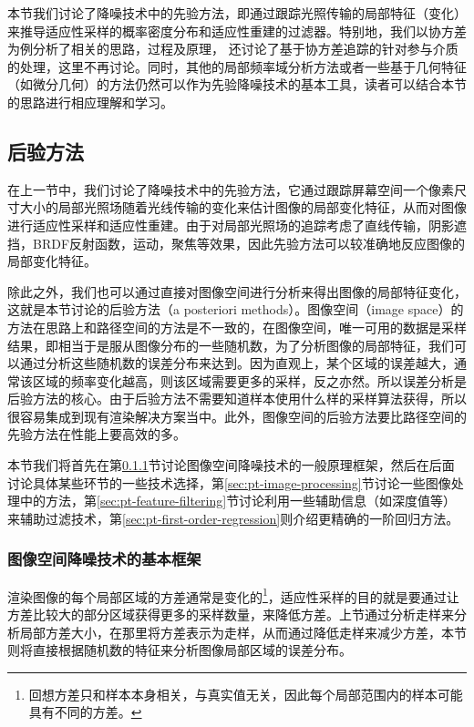 本节我们讨论了降噪技术中的先验方法，即通过跟踪光照传输的局部特征（变化）来推导适应性采样的概率密度分布和适应性重建的过滤器。特别地，我们以协方差为例分析了相关的思路，过程及原理，
\cite{a:ALocalFrequencyAnalysisofLightScatteringandAbsorption}还讨论了基于协方差追踪的针对参与介质的处理，这里不再讨论。同时，其他的局部频率域分析方法或者一些基于几何特征（如微分几何）的方法仍然可以作为先验降噪技术的基本工具，读者可以结合本节的思路进行相应理解和学习。







\subsection{后验方法}
在上一节中，我们讨论了降噪技术中的先验方法，它通过跟踪屏幕空间一个像素尺寸大小的局部光照场随着光线传输的变化来估计图像的局部变化特征，从而对图像进行适应性采样和适应性重建。由于对局部光照场的追踪考虑了直线传输，阴影遮挡，BRDF反射函数，运动，聚焦等效果，因此先验方法可以较准确地反应图像的局部变化特征。

除此之外，我们也可以通过直接对图像空间进行分析来得出图像的局部特征变化，这就是本节讨论的后验方法（a posteriori methods）。图像空间（image space）的方法在思路上和路径空间的方法是不一致的，在图像空间，唯一可用的数据是采样结果，即相当于是服从图像分布的一些随机数，为了分析图像的局部特征，我们可以通过分析这些随机数的误差分布来达到。因为直观上，某个区域的误差越大，通常该区域的频率变化越高，则该区域需要更多的采样，反之亦然。所以误差分析是后验方法的核心。由于后验方法不需要知道样本使用什么样的采样算法获得，所以很容易集成到现有渲染解决方案当中。此外，图像空间的后验方法要比路径空间的先验方法在性能上要高效的多。

本节我们将首先在第\ref{sec:pt-adaptive-framework}节讨论图像空间降噪技术的一般原理框架，然后在后面讨论具体某些环节的一些技术选择，第\ref{sec:pt-image-processing}节讨论一些图像处理中的方法，第\ref{sec:pt-feature-filtering}节讨论利用一些辅助信息（如深度值等）来辅助过滤技术，第\ref{sec:pt-first-order-regression}则介绍更精确的一阶回归方法。







\subsubsection{图像空间降噪技术的基本框架}\label{sec:pt-adaptive-framework}
渲染图像的每个局部区域的方差通常是变化的\footnote{回想方差只和样本本身相关，与真实值无关，因此每个局部范围内的样本可能具有不同的方差。}，适应性采样的目的就是要通过让方差比较大的部分区域获得更多的采样数量，来降低方差。上节通过分析走样来分析局部方差大小，在那里将方差表示为走样，从而通过降低走样来减少方差，本节则将直接根据随机数的特征来分析图像局部区域的误差分布。

